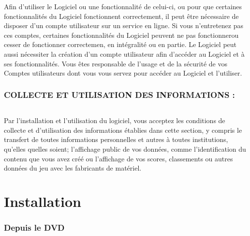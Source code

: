 \documentclass[titlepage, 13px, a4paper]{report}
\begin{document}
Afin d'utiliser le Logiciel ou une fonctionnalité de celui-ci, ou pour que
certaines fonctionnalités du Logiciel fonctionnent correctement, il peut être
nécessaire de disposer d'un compte utilisateur sur un service en ligne. Si vous
n'entretenez pas ces comptes, certaines fonctionnalités du Logiciel peuvent ne
pas fonctionnerou cesser de fonctionner correctemen, en intégralité ou en
partie. Le Logiciel peut aussi nécessiter la création d'un compte utilisateur
afin d'accéder au Logiciel et à ses fonctionnalités. Vous êtes responsable de
l'usage et de la sécurité de vos Comptes utilisateurs dont vous vous servez
pour accéder au Logiciel et l'utiliser. \\


\section*{COLLECTE ET UTILISATION DES INFORMATIONS :}
\paragraph*{} \hspace{0pt}
Par l'installation et l'utilisation du logiciel, vous acceptez les conditions
de collecte et d'utilisation des informations établies dans cette section, y
compris le transfert de toutes informations personnelles et autres à toutes
institutions, qu'elles quelles soient; l'affichage public de vos données, comme
l'identification du contenu que vous avez créé ou l'affichage de vos scores,
classements ou autres données du jeu avec les fabricants de matériel. \\


\newpage


\part{Installation} 

\section{Depuis le DVD}
\paragraph*{} \hspace{0pt}
\end{document}
